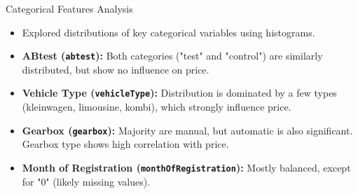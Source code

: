 \documentclass{beamer}
\begin{document}
\begin{frame}{Categorical Features Analysis}
        \begin{itemize}
                \item Explored distributions of key categorical variables using
                        histograms.
                \item \textbf{ABtest (\texttt{abtest}):} Both categories
                        ("test" and "control") are similarly distributed, but
                        show no influence on price.
                \item \textbf{Vehicle Type (\texttt{vehicleType}):}
                        Distribution is dominated by a few types (kleinwagen,
                        limousine, kombi), which strongly influence price.
                \item \textbf{Gearbox (\texttt{gearbox}):} Majority are manual,
                        but automatic is also significant. Gearbox type shows
                        high correlation with price.
                \item \textbf{Month of Registration
                        (\texttt{monthOfRegistration}):} Mostly balanced,
                        except for "0" (likely missing values).
        \end{itemize}
\end{frame}
\end{document}
